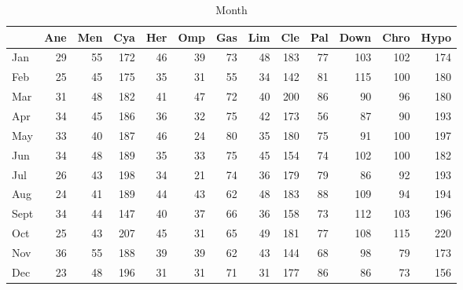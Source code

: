 \documentclass[article,nojss]{jss}\usepackage[]{graphicx}\usepackage[]{color}
\newenvironment{knitrout}{}{} %
\begin{document}
\begin{appendix}
\begin{knitrout}
\begin{table}[H]
\caption{\label{tab:monthdata}Month\label{tab:month}}
\centering
\begin{tabular}[t]{l|r|r|r|r|r|r|r|r|r|r|r|r}
\hline
  & Ane & Men & Cya & Her & Omp & Gas & Lim & Cle & Pal & Down & Chro & Hypo\\
\hline
Jan & 29 & 55 & 172 & 46 & 39 & 73 & 48 & 183 & 77 & 103 & 102 & 174\\
\hline
Feb & 25 & 45 & 175 & 35 & 31 & 55 & 34 & 142 & 81 & 115 & 100 & 180\\
\hline
Mar & 31 & 48 & 182 & 41 & 47 & 72 & 40 & 200 & 86 & 90 & 96 & 180\\
\hline
Apr & 34 & 45 & 186 & 36 & 32 & 75 & 42 & 173 & 56 & 87 & 90 & 193\\
\hline
May & 33 & 40 & 187 & 46 & 24 & 80 & 35 & 180 & 75 & 91 & 100 & 197\\
\hline
Jun & 34 & 48 & 189 & 35 & 33 & 75 & 45 & 154 & 74 & 102 & 100 & 182\\
\hline
Jul & 26 & 43 & 198 & 34 & 21 & 74 & 36 & 179 & 79 & 86 & 92 & 193\\
\hline
Aug & 24 & 41 & 189 & 44 & 43 & 62 & 48 & 183 & 88 & 109 & 94 & 194\\
\hline
Sept & 34 & 44 & 147 & 40 & 37 & 66 & 36 & 158 & 73 & 112 & 103 & 196\\
\hline
Oct & 25 & 43 & 207 & 45 & 31 & 65 & 49 & 181 & 77 & 108 & 115 & 220\\
\hline
Nov & 36 & 55 & 188 & 39 & 39 & 62 & 43 & 144 & 68 & 98 & 79 & 173\\
\hline
Dec & 23 & 48 & 196 & 31 & 31 & 71 & 31 & 177 & 86 & 86 & 73 & 156\\
\hline
\end{tabular}
\end{table}

\end{knitrout}


\begin{knitrout}
\color{fgcolor}\begin{table}[H]


\end{table}
\end{knitrout}
\end{appendix}
\end{document}
